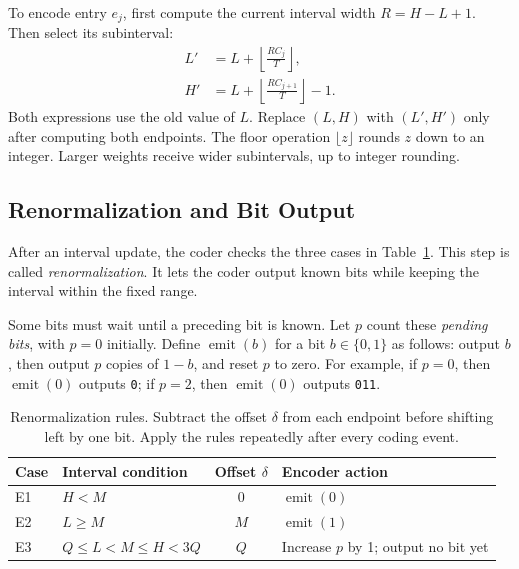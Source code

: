 \documentclass[12pt,onecolumn]{article}
\newcommand{\byte}[1]{\texttt{#1}}
\begin{document}
To encode entry $e_j$, first compute the current interval width
$R=H-L+1$. Then select its subinterval:
\begin{align}
  L'&=L+\left\lfloor\frac{R C_j}{T}\right\rfloor,\label{eq:ac-low}\\
  H'&=L+\left\lfloor\frac{R C_{j+1}}{T}\right\rfloor-1.
  \label{eq:ac-high}
\end{align}
Both expressions use the old value of $L$. Replace $(L,H)$ with $(L',H')$
only after computing both endpoints. The floor operation $\lfloor z\rfloor$
rounds $z$ down to an integer. Larger weights receive wider subintervals,
up to integer rounding.

\subsection{Renormalization and Bit Output}

After an interval update, the coder checks the three cases in
Table~\ref{tab:renormalization}.
This step is called \emph{renormalization}. It lets the coder output known
bits while keeping the interval within the fixed range.

Some bits must wait until a preceding bit is known.
Let $p$ count these \emph{pending bits}, with $p=0$ initially.
Define $\operatorname{emit}(b)$ for a bit $b\in\{0,1\}$ as follows:
output $b$, then output $p$ copies of $1-b$, and reset $p$ to zero.
For example, if $p=0$, then $\operatorname{emit}(0)$ outputs \byte{0}; if $p=2$, then $\operatorname{emit}(0)$ outputs \byte{011}.

\begin{table}[htbp]
\centering
\begingroup
{}
\small
\renewcommand{\arraystretch}{1.4}
\begin{tabularx}{\textwidth}{@{}l l c X@{}}
\toprule
Case & Interval condition & Offset $\delta$ & Encoder action\\
\midrule
E1 & $H<M$ & $0$ & $\operatorname{emit}(0)$\\
E2 & $L\geq M$ & $M$ & $\operatorname{emit}(1)$\\
E3 & $Q\leq L<M\leq H<3Q$ & $Q$ & Increase $p$ by 1; output no bit yet\\
\bottomrule
\end{tabularx}
\endgroup
\caption{Renormalization rules. Subtract the offset $\delta$ from each endpoint
before shifting left by one bit. Apply the rules repeatedly after every coding event.}
\label{tab:renormalization}
\end{table}
\end{document}
